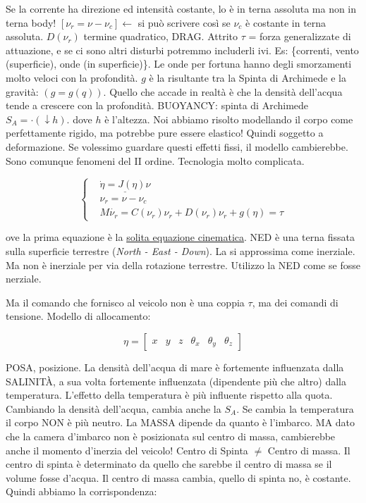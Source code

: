 Se la corrente ha direzione ed intensità costante, lo è in terna assoluta ma non in terna body! $[\nu_r=\nu-\nu_c]\leftarrow$ si può scrivere così se $\nu_c$ è costante in terna assoluta. $D(\nu_r)$ termine quadratico, DRAG. Attrito $\tau$ = forza generalizzate di attuazione, e se ci sono altri disturbi potremmo includerli ivi. Es: \{correnti, vento (superficie), onde (in superficie)\}. Le onde per fortuna hanno degli smorzamenti molto veloci con la profondità. $g$ è la risultante tra la Spinta di Archimede e la gravità: $(g=g(q))$. Quello che accade in realtà è che la densità dell'acqua tende a crescere con la profondità. BUOYANCY: spinta di Archimede $S_A=\mathord{\cdot}(\downarrow h)$. dove $h$ è l'altezza. Noi abbiamo risolto modellando il corpo come perfettamente rigido, ma potrebbe pure essere elastico! Quindi soggetto a deformazione. Se volessimo guardare questi effetti fissi, il modello cambierebbe. Sono comunque fenomeni del II ordine. Tecnologia molto complicata.

\[
	\left\{
	\begin{aligned}
	&\underline{\dot{\eta} = J(\eta)\nu}\\
	&\nu_r=\nu-\nu_c\\
	&M\dot{\nu_r} = C(\nu_r)\nu_r + D(\nu_r)\nu_r + g(\eta) = \tau
	\end{aligned}
	\right.
\]

ove la prima equazione è la \underline{solita equazione cinematica}. NED è una terna fissata sulla superficie terrestre (\textit{North - East - Down}). La si approssima come inerziale. Ma non è inerziale per via della rotazione terrestre. Utilizzo la NED come se fosse nerziale.

Ma il comando che fornisco al veicolo non è una coppia $\tau$, ma dei comandi di tensione. Modello di allocamento:

\[
	\eta = \begin{bmatrix}x&y&z&\theta_x&\theta_y&\theta_z\end{bmatrix}
\]

POSA, posizione. La densità dell'acqua di mare è fortemente influenzata dalla SALINIT\`A, a sua volta fortemente influenzata (dipendente più che altro) dalla temperatura. L'effetto della temperatura è più influente rispetto alla quota. Cambiando la densità dell'acqua, cambia anche la $S_A$. Se cambia la temperatura il corpo NON è più neutro. La MASSA dipende da quanto è l'imbarco. MA dato che la camera d'imbarco non è posizionata sul centro di massa, cambierebbe anche il momento d'inerzia del veicolo! Centro di Spinta $\neq$ Centro di massa. Il centro di spinta è determinato da quello che sarebbe il centro di massa se il volume fosse d'acqua. Il centro di massa cambia, quello di spinta no, è costante. Quindi abbiamo la corrispondenza:

